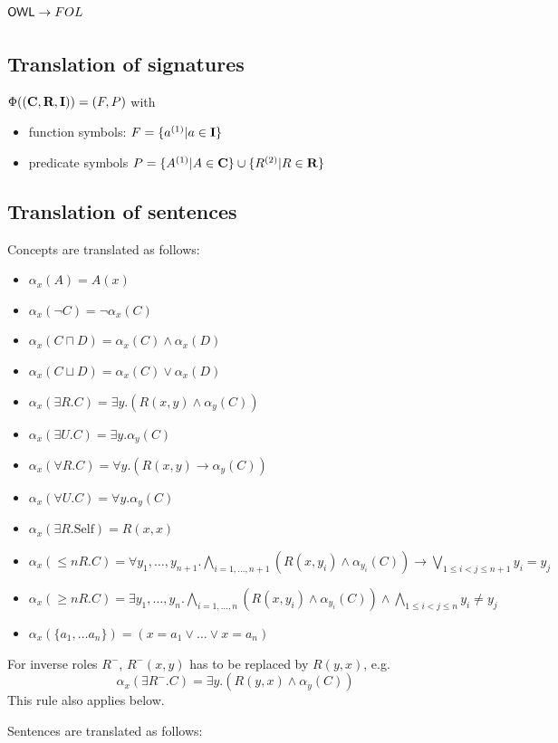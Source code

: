 \documentclass[10pt,fleqn,%
\ifpretendfinal
final%
\else
draft%
\fi,
]{scrreprt}
\newcommand{\sclause}[1]{\section{#1}}
\newcommand{\ssclause}[1]{\subsection{#1}}
\begin{document}
\sclause{$\mathsf{OWL} \rightarrow FOL$}

\ssclause{Translation of signatures}

 $\Phi((\textbf{C}, \textbf{R}, \textbf{I})) =  (F, P)$ with
\begin{itemize}
	\item function symbols: $F = \{a^{(1)} \vert a \in \textbf{I}\}$
	\item predicate symbols $P = \{A^{(1)} \vert A \in \mathbf{C} \} \cup \{ R^{(2)} \vert R \in \mathbf{R}\}$
\end{itemize}


\ssclause{Translation of sentences}

Concepts are translated as follows:
\begin{itemize}
 \item $\alpha_x(A) = A(x)$
 \item $\alpha_x(\lnot C) = \lnot \alpha_x (C)$
 \item $\alpha_x(C \sqcap D) = \alpha_x(C) \land \alpha_x(D)$
 \item $\alpha_x(C \sqcup D) = \alpha_x(C) \lor \alpha_x(D)$ 
 \item $\alpha_x(\exists R.C) = \exists y . (R(x,y) \land \alpha_y(C))$
 \item $\alpha_x(\exists U.C) = \exists y . \alpha_y(C)$
 \item $\alpha_x(\forall R.C) = \forall y . (R(x,y) \rightarrow \alpha_y(C))$
 \item $\alpha_x(\forall U.C) = \forall y . \alpha_y(C)$
 \item $\alpha_x(\exists R.\text{Self}) = R(x,x)$
 \item $\alpha_x(\leq n R. C) = \forall y_1,\ldots,y_{n+1} .  \bigwedge_{i=1,\ldots,n+1}(R(x,y_i) \land \alpha_{y_i}(C)) \rightarrow\bigvee_{1\leq i<j\leq n+1}y_i = y_j$
 \item $\alpha_x(\geq n R. C) = \exists y_1,\ldots,y_n . \bigwedge_{i=1,\ldots,n}(R(x,y_i) \land \alpha_{y_i}(C)) \wedge \bigwedge_{1\leq i<j\leq n}y_i\not= y_j $
 \item $\alpha_x(\{a_1, \ldots a_n \}) = (x=a_1\vee \ldots \vee x=a_n)$
\end{itemize}

For inverse roles $R^-$, $R^-(x,y)$ has to be replaced by $R(y,x)$, e.g.
 $$\alpha_x(\exists R^-.C) = \exists y . (R(y,x) \land \alpha_y(C))$$
This rule also applies below.


Sentences are translated as follows:
\end{document}

